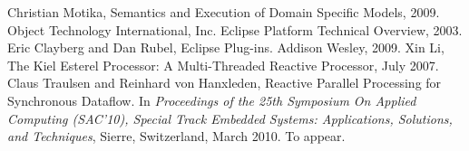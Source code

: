 \begin{thebibliography}{cmot-dt}
 Christian Motika, Semantics and Execution of
 Domain Specific Models, 2009.
 Object Technology International, Inc. Eclipse Platform Technical Overview,
2003.
 Eric Clayberg and Dan Rubel, Eclipse Plug-ins. Addison Wesley, 2009.
 Xin Li, The Kiel Esterel Processor: A Multi-Threaded Reactive Processor, July 2007.
 Claus Traulsen and Reinhard von Hanxleden, Reactive Parallel Processing 
for Synchronous Dataflow. In \textit{Proceedings of the 25th  Symposium On Applied Computing (SAC'10), 
Special Track Embedded  Systems: Applications, Solutions, and Techniques}, Sierre, Switzerland, March 2010. To appear.
\end{thebibliography}
